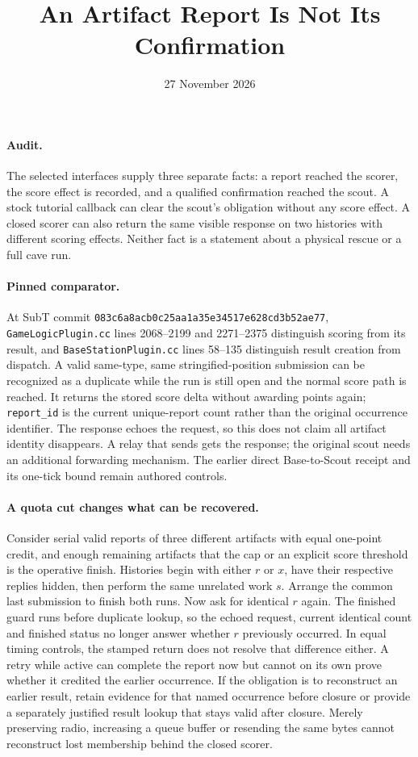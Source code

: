 \documentclass[11pt]{article}
\title{An Artifact Report Is Not Its Confirmation}
\date{27 November 2026}
\begin{document}
\maketitle
\paragraph{Audit.} The selected interfaces supply three separate
facts: a report reached the scorer, the score effect is recorded,
and a qualified confirmation reached the scout. A stock tutorial
callback can clear the scout's obligation without any score effect.
A closed scorer can also return the same visible response on two
histories with different scoring effects. Neither fact is a
statement about a physical rescue or a full cave run.

\paragraph{Pinned comparator.} At SubT commit \texttt{083c6a8acb0c25aa1a35e34517e628cd3b52ae77}, \texttt{GameLogicPlugin.cc} lines 2068--2199 and 2271--2375 distinguish scoring from its result, and \texttt{BaseStationPlugin.cc} lines 58--135 distinguish result creation from dispatch. A valid same-type, same stringified-position submission can be recognized as a duplicate while the run is still open and the normal score path is reached. It returns the stored score delta without awarding points again; \texttt{report\_id} is the current unique-report count rather than the original occurrence identifier. The response echoes the request, so this does not claim all artifact identity disappears. A relay that sends gets the response; the original scout needs an additional forwarding mechanism. The earlier direct Base-to-Scout receipt and its one-tick bound remain authored controls.

\paragraph{A quota cut changes what can be recovered.} Consider serial valid reports of three different artifacts with equal one-point credit, and enough remaining artifacts that the cap or an explicit score threshold is the operative finish. Histories begin with either \(r\) or \(x\), have their respective replies hidden, then perform the same unrelated work \(s\). Arrange the common last submission to finish both runs. Now ask for identical \(r\) again. The finished guard runs before duplicate lookup, so the echoed request, current identical count and finished status no longer answer whether \(r\) previously occurred. In equal timing controls, the stamped return does not resolve that difference either. A retry while active can complete the report now but cannot on its own prove whether it credited the earlier occurrence. If the obligation is to reconstruct an earlier result, retain evidence for that named occurrence before closure or provide a separately justified result lookup that stays valid after closure. Merely preserving radio, increasing a queue buffer or resending the same bytes cannot reconstruct lost membership behind the closed scorer.
\end{document}
